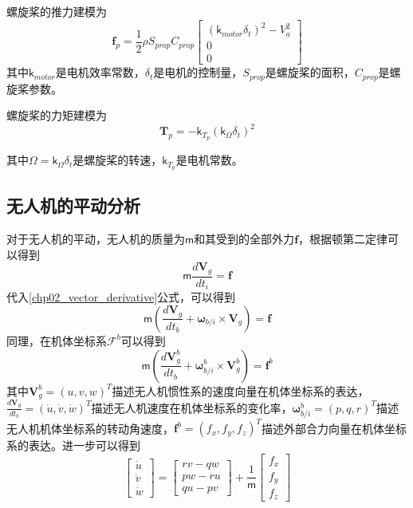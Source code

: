 螺旋桨的推力建模为
\begin{equation}
\mathbf{f}_p = \frac{1}{2} \rho S_{prop} C_{prop}  \begin{bmatrix} (\mathsf{k}_{motor} \delta_t)^2 - V_a^2  \\ 0  \\ 0  \end{bmatrix}
\end{equation}
其中$\mathsf{k}_{motor}$是电机效率常数，$\delta_t$是电机的控制量，$S_{prop}$是螺旋桨的面积，$C_{prop}$是螺旋桨参数。

螺旋桨的力矩建模为
\begin{equation}
\mathbf{T}_p = -\mathsf{k}_{T_p} (\mathsf{k}_{\Omega} \delta_{t})^2
\end{equation}

其中$\Omega = \mathsf{k}_{\Omega} \delta_{t}$是螺旋桨的转速，$\mathsf{k}_{T_p}$是电机常数。

\subsection{无人机的平动分析}
对于无人机的平动，无人机的质量为$\mathsf{m}$和其受到的全部外力$\mathbf{f}$，根据顿第二定律可以得到
\begin{equation}
\mathsf{m} \frac{d \mathbf{V}_g}{d t_i} = \mathbf{f}
\end{equation}
代入\ref{chp02_vector_derivative}公式，可以得到
\begin{equation}
\mathsf{m}(\frac{d \mathbf{V}_g }{dt_b}+ \mathbf{\omega}_{b/i} \times \mathbf{V}_g)=\mathbf{f}
\end{equation}
同理，在机体坐标系$\mathcal{F}^b$可以得到
\begin{equation}
\mathsf{m}(\frac{d \mathbf{V}^b_g }{dt_b}+ \mathbf{\omega}_{b/i}^b \times \mathbf{V}^b_g)=\mathbf{f}^b
\end{equation}
其中$\mathbf{V}_g^b=(u, v, w)^T$描述无人机惯性系的速度向量在机体坐标系的表达，$\frac{d \mathbf{V}_g }{dt_b}=(\dot{u}, \dot{v}, \dot{w})^T$描述无人机速度在机体坐标系的变化率，$\mathbf{\omega}_{b/i}^b=(p, q, r)^T$描述无人机机体坐标系的转动角速度，$\mathbf{f}^b = (f_x, f_y, f_z)^T$描述外部合力向量在机体坐标系的表达。进一步可以得到
\begin{equation}
\begin{bmatrix} \dot{u} \\ \dot{v} \\ \dot{w}  \end{bmatrix} = \begin{bmatrix} rv-qw \\ pw-ru \\ qu-pv  \end{bmatrix} + \frac{1}{\mathsf{m}} \begin{bmatrix} f_x \\ f_y \\ f_z  \end{bmatrix}
\end{equation}



